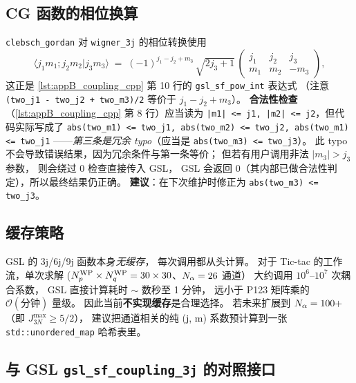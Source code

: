 \subsection{CG 函数的相位换算}

\texttt{clebsch\_gordan} 对 \texttt{wigner\_3j} 的相位转换使用
\begin{equation}
\langle j_1 m_1; j_2 m_2 | j_3 m_3 \rangle
\;=\;
(-1)^{j_1 - j_2 + m_3}\,
\sqrt{2 j_3 + 1}\,
\begin{pmatrix} j_1 & j_2 & j_3 \\ m_1 & m_2 & -m_3 \end{pmatrix},
\label{eq:appB_CG_from_3j}
\end{equation}
这正是 \cref{lst:appB_coupling_cpp} 第 10 行的 \texttt{gsl\_sf\_pow\_int} 表达式
（注意 \texttt{(two\_j1 - two\_j2 + two\_m3)/2} 等价于
$j_1 - j_2 + m_3$）。
\textbf{合法性检查}（\cref{lst:appB_coupling_cpp} 第 8 行）应当读为
\texttt{|m1| <= j1, |m2| <= j2}，但代码实际写成了
\texttt{abs(two\_m1) <= two\_j1, abs(two\_m2) <= two\_j2, abs(two\_m1) <= two\_j1}
——\emph{第三条是冗余 typo}（应当是 \texttt{abs(two\_m3) <= two\_j3}）。
此 typo 不会导致错误结果，因为冗余条件与第一条等价；
但若有用户调用非法 $|m_3| > j_3$ 参数，
则会绕过 0 检查直接传入 GSL，
GSL 会返回 0（其内部已做合法性判定），所以最终结果仍正确。
\textbf{建议}：在下次维护时修正为 \texttt{abs(two\_m3) <= two\_j3}。

\subsection{缓存策略}

GSL 的 3j/6j/9j 函数本身\emph{无缓存}，
每次调用都从头计算。
对于 Tic-tac 的工作流，单次求解 ($N_p^{\text{WP}} \times N_q^{\text{WP}} = 30\times 30$、$N_\alpha = 26$ 通道）
大约调用 $10^{6}$–$10^{7}$ 次耦合系数，
GSL 直接计算耗时 $\sim$ 数秒至 1 分钟，
远小于 P123 矩阵乘的 $\mathcal{O}(\text{分钟})$ 量级。
因此当前\textbf{不实现缓存}是合理选择。
若未来扩展到 $N_\alpha = 100+$（即 $J_{3N}^{\max} \ge 5/2$），
建议把通道相关的纯 (j, m) 系数预计算到一张
\texttt{std::unordered\_map} 哈希表里。

\subsection{与 GSL \texttt{gsl\_sf\_coupling\_3j} 的对照接口}

